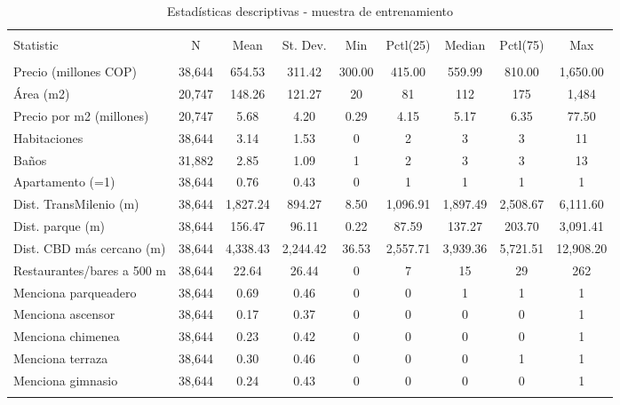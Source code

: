 
\begin{table}[!htbp] \centering 
  \caption{Estadísticas descriptivas - muestra de entrenamiento} 
  \label{} 
\begin{tabular}{@{\extracolsep{5pt}}lcccccccc} 
\\[-1.8ex]\hline 
\hline \\[-1.8ex] 
Statistic & \multicolumn{1}{c}{N} & \multicolumn{1}{c}{Mean} & \multicolumn{1}{c}{St. Dev.} & \multicolumn{1}{c}{Min} & \multicolumn{1}{c}{Pctl(25)} & \multicolumn{1}{c}{Median} & \multicolumn{1}{c}{Pctl(75)} & \multicolumn{1}{c}{Max} \\ 
\hline \\[-1.8ex] 
Precio (millones COP) & 38,644 & 654.53 & 311.42 & 300.00 & 415.00 & 559.99 & 810.00 & 1,650.00 \\ 
Área (m2) & 20,747 & 148.26 & 121.27 & 20 & 81 & 112 & 175 & 1,484 \\ 
Precio por m2 (millones) & 20,747 & 5.68 & 4.20 & 0.29 & 4.15 & 5.17 & 6.35 & 77.50 \\ 
Habitaciones & 38,644 & 3.14 & 1.53 & 0 & 2 & 3 & 3 & 11 \\ 
Baños & 31,882 & 2.85 & 1.09 & 1 & 2 & 3 & 3 & 13 \\ 
Apartamento (=1) & 38,644 & 0.76 & 0.43 & 0 & 1 & 1 & 1 & 1 \\ 
Dist. TransMilenio (m) & 38,644 & 1,827.24 & 894.27 & 8.50 & 1,096.91 & 1,897.49 & 2,508.67 & 6,111.60 \\ 
Dist. parque (m) & 38,644 & 156.47 & 96.11 & 0.22 & 87.59 & 137.27 & 203.70 & 3,091.41 \\ 
Dist. CBD más cercano (m) & 38,644 & 4,338.43 & 2,244.42 & 36.53 & 2,557.71 & 3,939.36 & 5,721.51 & 12,908.20 \\ 
Restaurantes/bares a 500 m & 38,644 & 22.64 & 26.44 & 0 & 7 & 15 & 29 & 262 \\ 
Menciona parqueadero & 38,644 & 0.69 & 0.46 & 0 & 0 & 1 & 1 & 1 \\ 
Menciona ascensor & 38,644 & 0.17 & 0.37 & 0 & 0 & 0 & 0 & 1 \\ 
Menciona chimenea & 38,644 & 0.23 & 0.42 & 0 & 0 & 0 & 0 & 1 \\ 
Menciona terraza & 38,644 & 0.30 & 0.46 & 0 & 0 & 0 & 1 & 1 \\ 
Menciona gimnasio & 38,644 & 0.24 & 0.43 & 0 & 0 & 0 & 0 & 1 \\ 
\hline \\[-1.8ex] 
\end{tabular} 
\end{table} 

